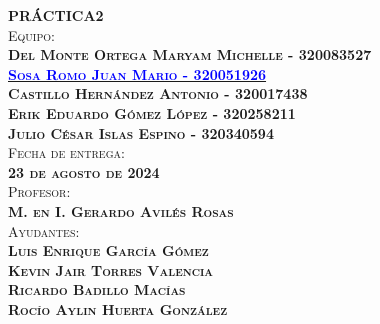 \begin{titlepage}
\begin{minipage}[c][0.81\textheight][t]{0.75\textwidth}
\begin{center}
			\textsc{\LARGE \textbf{P}\hspace{1cm}\textbf{R}\hspace{1cm}\textbf{Á}\hspace{1cm}\textbf{C}\hspace{1cm}\textbf{T}\hspace{1cm}\textbf{I}\hspace{1cm}\textbf{C}\hspace{1cm}\textbf{A}\hspace{1.3cm}\textbf{2}}\\[2cm]
			\textsc{\Large{Equipo:}\normalsize \\
                \vspace{.3cm}
				\textbf{Del Monte Ortega Maryam Michelle - 320083527 \\
                \vspace{.2cm}
				\href{https://github.com/JuanSosaCiencias}{\textcolor{blue}{Sosa Romo Juan Mario - 320051926}} \\
                \vspace{.2cm}
				Castillo Hernández Antonio - 320017438 \\
                \vspace{.2cm}
                Erik Eduardo Gómez López - 320258211 \\
                \vspace{.2cm}
                Julio César Islas Espino - 320340594}}\\[0.5cm]     
			
			\textsc{{Fecha de entrega: \\ \textbf{23 de agosto de 2024}}}\\[0.5cm]        
			
			\textsc{{Profesor: \\ \textbf{M. en I. Gerardo Avilés Rosas}}}\\[0.5cm]  
			
			\textsc{Ayudantes: \\ \textbf{Luis Enrique García Gómez \\ Kevin Jair Torres Valencia \\ Ricardo Badillo Macías \\ Rocío Aylin Huerta González
			} }
			
			
			\vspace{0.5cm}
		\end{center}
	\end{minipage}
\end{titlepage}
